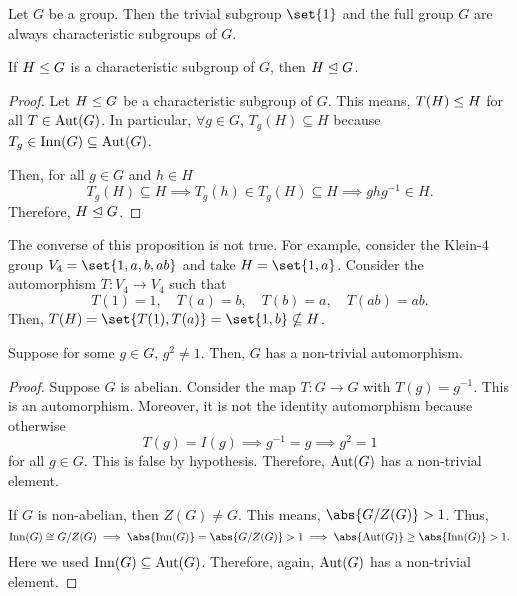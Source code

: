 \documentclass[11pt]{penrose}
\begin{document}
\begin{remark}
    Let $G$ be a group. Then the trivial subgroup $\set{1}$ and the full group $G$ are always characteristic subgroups of $G$.
\end{remark}

\begin{nprop}
    If $H \mathrel{\leq} G$ is a characteristic subgroup of $G$, then $H \mathrel{\trianglelefteq} G$.
\end{nprop}
\begin{proof}
    Let $H \mathrel{\leq} G$ be a characteristic subgroup of $G$. This means, $T(H) \mathrel{\leq} H$ for all $T \in \operatorname{Aut}(G)$. In particular, $\forall g \in G$, $T_{g}(H) \subseteq H$ because $T_{g} \in \operatorname{Inn}(G) \subseteq \operatorname{Aut}(G)$.

    Then, for all $g \in G$ and $h \in H$
    \begin{equation*}
        T_{g}(H) \subseteq H
        \implies
        T_{g}(h) \in T_{g}(H) \subseteq H
        \implies
        g h g^{-1} \in H.
    \end{equation*}
    Therefore, $H \mathrel{\trianglelefteq} G$.
\end{proof}

\begin{remark}
    The converse of this proposition is not true. For example, consider the Klein-$4$ group $V_{4} = \set{1, a, b, ab}$ and take $H = \set{1, a}$. Consider the automorphism $T: V_{4} \to V_{4}$ such that
    \begin{equation*}
        T(1) = 1, \quad
        T(a) = b, \quad
        T(b) = a, \quad
        T(ab) = ab.
    \end{equation*}
    Then, $T(H) = \set{T(1), T(a)} = \set{1, b} \nsubseteq H$.
\end{remark}

\begin{nprop}
    Suppose for some $g \in G$, $g^{2} \neq 1$. Then, $G$ has a non-trivial automorphism.
\end{nprop}
\begin{proof}
    Suppose $G$ is abelian. Consider the map $T: G \to G$ with $T(g) = g^{-1}$. This is an automorphism. Moreover, it is not the identity automorphism because otherwise
    \begin{equation*}
        T(g) = I(g)
        \implies
        g^{-1} = g
        \implies
        g^{2} = 1
    \end{equation*}
    for all $g \in G$. This is false by hypothesis. Therefore, $\operatorname{Aut}(G)$ has a non-trivial element.

    If $G$ is non-abelian, then $Z(G) \neq G$. This means, $\abs{G / Z(G)} > 1$. Thus,
    \begin{equation*}
        \Inn(G) \isom G / Z(G)
        \implies
        \abs{\Inn(G)} = \abs{G / Z(G)} > 1
        \implies
        \abs{\Aut(G)} \geq \abs{\Inn(G)} > 1.
    \end{equation*}
    Here we used $\operatorname{Inn}(G) \subseteq \operatorname{Aut}(G)$. Therefore, again, $\operatorname{Aut}(G)$ has a non-trivial element.
\end{proof}
\end{document}
